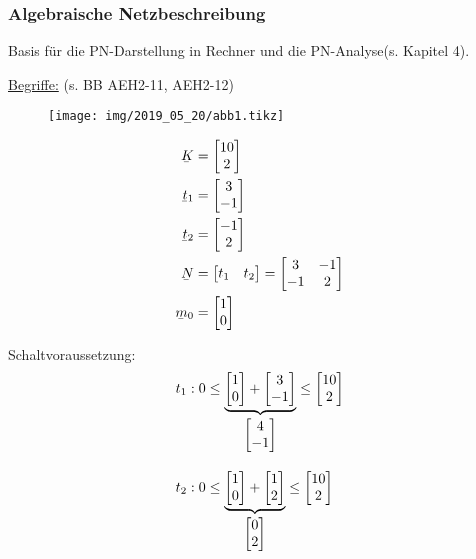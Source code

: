 \subsubsection{Algebraische Netzbeschreibung}
Basis für die PN-Darstellung in Rechner und die PN-Analyse(s. Kapitel 4).

\underline{Begriffe:} (s. BB AEH2-11, AEH2-12)

\beispiel

\begin{figure}[H]
	\centering
	\texttt{[image: img/2019\_05\_20/abb1.tikz]}
\end{figure}

\begin{subequations}
	\begin{align}
	\ubar{K}   &= \begin{bmatrix}10\\2\end{bmatrix} \\
	\ubar{t}_1 &= \begin{bmatrix}3\\-1\end{bmatrix}\\
	\ubar{t}_2 &= \begin{bmatrix}-1\\2\end{bmatrix}\\
	\ubar{N}   &= \begin{bmatrix}t_1 & t_2\end{bmatrix} = \begin{bmatrix}3 & -1 \\ -1 & 2\end{bmatrix}\\
	\ubar{m}_0 &= \begin{bmatrix}1 \\ 0\end{bmatrix}
	\end{align}
\end{subequations}

Schaltvoraussetzung:
\begin{subequations}
	\begin{align}
	t_1 &: 0 \le \underbrace{\begin{bmatrix}1\\0\end{bmatrix}+\begin{bmatrix}3\\-1\end{bmatrix}}_{\begin{bmatrix}4\\-1\end{bmatrix}} \le \begin{bmatrix}10\\2\end{bmatrix}\\[2ex]
	t_2 &: 0 \le \underbrace{\begin{bmatrix}1\\0\end{bmatrix}+\begin{bmatrix}1\\2\end{bmatrix}}_{\begin{bmatrix}0\\2\end{bmatrix}} \le \begin{bmatrix}10\\2\end{bmatrix}
	\end{align}
\end{subequations}

